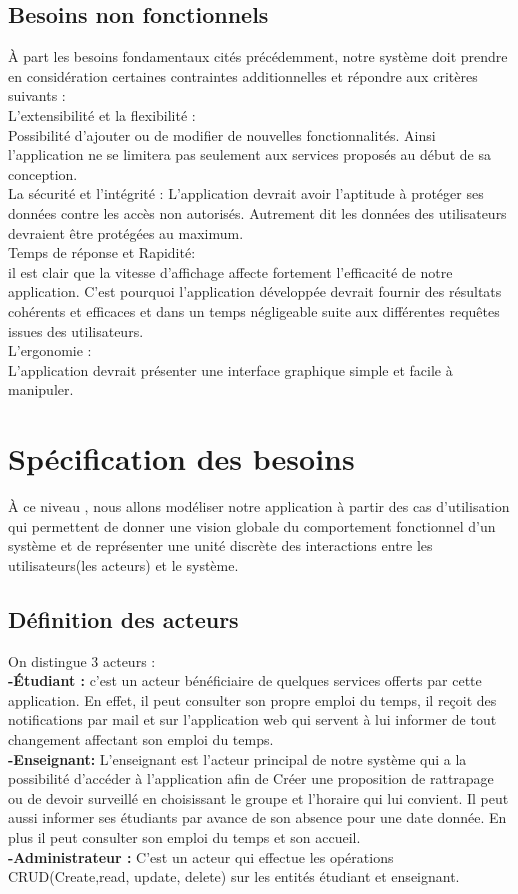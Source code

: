 \documentclass[a4paper,12pt,oneside]{report}
\begin{document}
  \subsection{Besoins non fonctionnels}
  À part les besoins fondamentaux cités précédemment, notre système doit  prendre
en considération certaines contraintes additionnelles et répondre aux critères suivants : \\ 
L'extensibilité et la flexibilité : \\
Possibilité d'ajouter ou de modifier de nouvelles fonctionnalités. Ainsi l'application ne se limitera pas seulement aux services proposés au début de sa conception. \\ 
La sécurité et l'intégrité :
L'application devrait avoir l'aptitude à protéger ses données contre les accès non autorisés.  Autrement dit les données des utilisateurs devraient être protégées  au maximum. \\
Temps de réponse et Rapidité: \\
il est clair que la vitesse d'affichage affecte fortement l'efficacité de notre application.
C'est pourquoi l'application développée devrait  fournir des résultats  cohérents et efficaces et dans un temps négligeable  suite aux différentes requêtes issues  des utilisateurs.\\ 
L'ergonomie : \\
L'application devrait présenter une interface graphique simple et facile à manipuler.
 \section{Spécification des besoins}
  À ce niveau , nous allons modéliser notre application à partir des cas d'utilisation qui permettent de donner une vision globale du comportement fonctionnel d'un système et de représenter une unité discrète des interactions entre les utilisateurs(les acteurs) et le système. 
  \subsection{Définition des acteurs}
On distingue 3 acteurs : \\
\textbf{-Étudiant : }
c'est un acteur bénéficiaire de quelques services offerts par cette application. En effet, il peut consulter  son propre emploi du temps, il  reçoit  des notifications par mail et sur l'application web qui servent à lui informer de tout changement affectant son emploi du temps.\\
\textbf{-Enseignant: }
L'enseignant est l'acteur principal de notre système qui a la possibilité d'accéder à l'application afin de Créer une proposition   de rattrapage ou de devoir surveillé en choisissant le groupe et l'horaire qui lui convient.
Il peut aussi informer ses étudiants par avance de son absence pour une date donnée. En plus il peut consulter son emploi du temps et son accueil.\\
\textbf{-Administrateur : }
C'est un acteur qui  effectue les opérations CRUD(Create,read, update, delete) sur les entités étudiant et enseignant.
\end{document}

